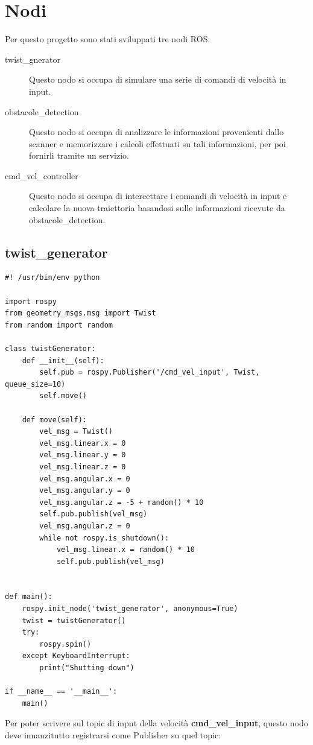 \documentclass[Lau, binding=0.6cm, oneside]{sapthesis}
\begin{document}
\section{Nodi}
Per questo progetto sono stati sviluppati tre nodi ROS:
\begin{description}
	\item[twist\_gnerator] Questo nodo si occupa di simulare una serie di comandi di velocità in input.
	\item[obstacole\_detection] Questo nodo si occupa di analizzare le informazioni provenienti dallo scanner e memorizzare i calcoli effettuati su tali informazioni, per poi fornirli tramite un servizio.
	\item[cmd\_vel\_controller] Questo nodo si occupa di intercettare i comandi di velocità in input e calcolare la nuova traiettoria basandosi sulle informazioni ricevute da obstacole\_detection.
\end{description}

\subsection{twist\_generator}
\begin{lstlisting}
#! /usr/bin/env python

import rospy
from geometry_msgs.msg import Twist
from random import random

class twistGenerator:
    def __init__(self):
        self.pub = rospy.Publisher('/cmd_vel_input', Twist, queue_size=10)
        self.move()
    
    def move(self):
        vel_msg = Twist()
        vel_msg.linear.x = 0
        vel_msg.linear.y = 0
        vel_msg.linear.z = 0
        vel_msg.angular.x = 0
        vel_msg.angular.y = 0
        vel_msg.angular.z = -5 + random() * 10
        self.pub.publish(vel_msg)
        vel_msg.angular.z = 0
        while not rospy.is_shutdown():
            vel_msg.linear.x = random() * 10
            self.pub.publish(vel_msg)


def main():
    rospy.init_node('twist_generator', anonymous=True)
    twist = twistGenerator()
    try:
        rospy.spin()
    except KeyboardInterrupt:
        print("Shutting down")

if __name__ == '__main__':
    main()
\end{lstlisting}

Per poter scrivere sul topic di input della velocità \textbf{cmd\_vel\_input}, questo nodo deve innanzitutto registrarsi come Publisher su quel topic:
\end{document}

